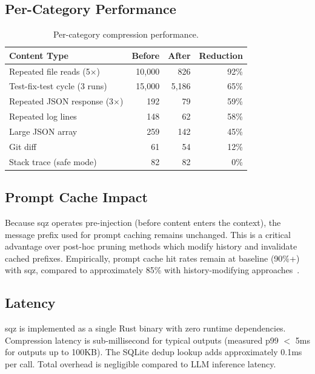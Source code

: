 \documentclass[10pt,twocolumn]{article}
\begin{document}
\subsection{Per-Category Performance}

\begin{table}[h]
\centering
\small
\begin{tabular}{@{}lrrr@{}}
\toprule
\textbf{Content Type} & \textbf{Before} & \textbf{After} & \textbf{Reduction} \\
\midrule
Repeated file reads (5$\times$) & 10,000 & 826 & 92\% \\
Test-fix-test cycle (3 runs) & 15,000 & 5,186 & 65\% \\
Repeated JSON response (3$\times$) & 192 & 79 & 59\% \\
Repeated log lines & 148 & 62 & 58\% \\
Large JSON array & 259 & 142 & 45\% \\
Git diff & 61 & 54 & 12\% \\
Stack trace (safe mode) & 82 & 82 & 0\% \\
\bottomrule
\end{tabular}
\caption{Per-category compression performance.}
\label{tab:percategory}
\end{table}

\subsection{Prompt Cache Impact}

Because sqz operates pre-injection (before content enters the context), the message prefix used for prompt caching remains unchanged. This is a critical advantage over post-hoc pruning methods which modify history and invalidate cached prefixes. Empirically, prompt cache hit rates remain at baseline (90\%+) with sqz, compared to approximately 85\% with history-modifying approaches~\cite{dcp2025}.

\subsection{Latency}

sqz is implemented as a single Rust binary with zero runtime dependencies. Compression latency is sub-millisecond for typical outputs (measured p99 $<$ 5ms for outputs up to 100KB). The SQLite dedup lookup adds approximately 0.1ms per call. Total overhead is negligible compared to LLM inference latency.

\end{document}
